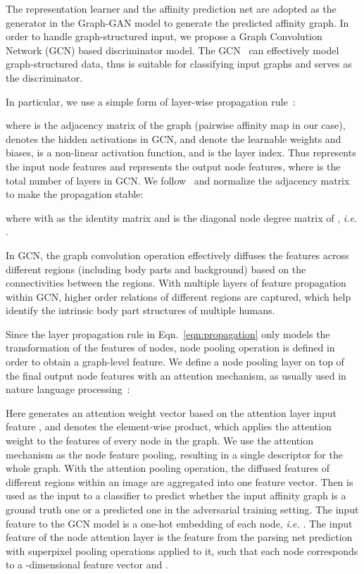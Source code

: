 \documentclass[10pt, letterpaper]{article}
\begin{document}
The representation learner and the affinity prediction net are adopted as the generator in the Graph-GAN model to generate the predicted affinity graph. In order to handle graph-structured input, we propose a Graph Convolution Network (GCN) based discriminator model. The GCN~\cite{kipf2016semi,defferrard2016convolutional,manessi2017dynamic} can effectively model graph-structured data, thus is suitable for classifying input graphs and serves as the discriminator.  

In particular, we use a simple form of layer-wise propagation rule~\cite{kipf2016semi,manessi2017dynamic}:

where  is the adjacency matrix of the graph (pairwise affinity map in our case),  denotes the hidden activations in GCN,  and  denote the learnable weights and biases,  is a non-linear activation function, and  is the layer index. Thus  represents the input node features and  represents the output node features, where  is the total number of layers in GCN. We follow~\cite{kipf2016semi} and normalize the adjacency matrix to make the propagation stable:


where  with  as the identity matrix and  is the diagonal node degree matrix of , \emph{i.e.} . 

In GCN, the graph convolution operation effectively diffuses the features across different regions (including body parts and background) based on the connectivities between the regions. With multiple layers of feature propagation within GCN,  higher order relations of different regions are captured, which help identify the intrinsic body part structures of multiple humans. 

Since the layer propagation rule in Eqn.~\eqref{eqn:propagation} only models the transformation of the features of nodes, node pooling operation is defined in order to obtain a graph-level feature. We define a node pooling layer on top of the final output node features with an attention mechanism, as usually used in nature language processing~\cite{lin2017structured,li2015gated}:

Here  generates an attention weight vector based on the attention layer input feature , and  denotes the element-wise product, which applies the attention weight to the features of every node in the graph. We use the attention mechanism as the node feature pooling, resulting in a single descriptor  for the whole graph. With the attention pooling operation, the diffused features of different regions within an image are aggregated into one feature vector. Then  is  used as the input to a classifier to predict whether the input affinity graph is a ground truth one or a predicted one in the adversarial training setting. The input feature to the GCN model is a one-hot embedding of each node, \emph{i.e.}  . The input feature of the node attention layer is the feature from the parsing net prediction with superpixel pooling operations applied to it, such that each node corresponds to a -dimensional feature vector and .
\end{document}
